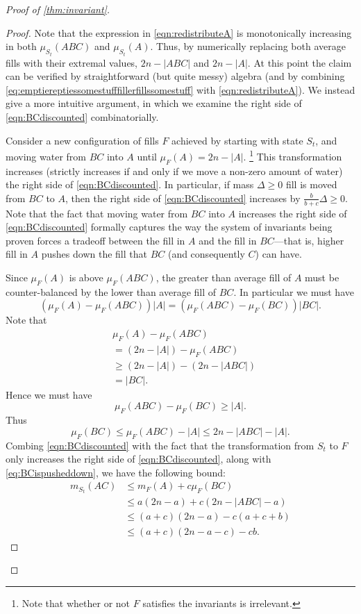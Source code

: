 \begin{proof}[Proof of \cref{thm:invariant}]
\begin{proof}
Note that the expression in \eqref{eqn:redistributeA} is monotonically
increasing in both $\mu_{S_t}(ABC)$ and $\mu_{S_t}(A)$. Thus, by numerically
replacing both average fills with their extremal values, $2n-|ABC|$ and
$2n-|A|$. At this point the claim can be verified by straightforward (but quite
messy) algebra (and by combining
\eqref{eq:emptiereptiessomestufffillerfillssomestuff} with
\eqref{eqn:redistributeA}). We instead give a more intuitive argument, in which
we examine the right side of \eqref{eqn:BCdiscounted} combinatorially.

 Consider a new configuration of fills $F$ achieved by starting with state
 $S_t$, and moving water from $BC$ into $A$ until $\mu_{F}(A) = 2n-|A|$.
 \footnote{Note that whether or not $F$ satisfies the invariants is
 irrelevant.} This transformation increases (strictly increases if and only if
 we move a non-zero amount of water) the right side of
 \eqref{eqn:BCdiscounted}. In particular, if mass $\Delta \ge 0$ fill is moved
 from $BC$ to $A$, then the right side of \eqref{eqn:BCdiscounted} increases by
 $\frac{b}{b+c} \Delta \ge 0$. Note that the fact that moving water from $BC$
 into $A$ increases the right side of \eqref{eqn:BCdiscounted} formally
 captures the way the system of invariants being proven forces a tradeoff
 between the fill in $A$ and the fill in $BC$---that is, higher fill in $A$
 pushes down the fill that $BC$ (and consequently $C$) can have.

  Since $\mu_F(A)$ is above $\mu_{F}(ABC)$, the greater than average fill of
  $A$ must be counter-balanced by the lower than average fill of $BC$. In
  particular we must have
  $$(\mu_F(A) - \mu_F(ABC))|A| = (\mu_F(ABC) -\mu_F(BC))|BC|.$$
  Note that 
  \begin{align*}
  & \mu_F(A) -\mu_F(ABC) \\
  &= (2n-|A|) - \mu_F(ABC) \\
  &\ge (2n-|A|) - (2n-|ABC|) \\
  &= |BC|.    
  \end{align*}
  Hence we must have 
  $$\mu_F(ABC) - \mu_F(BC) \ge |A|.$$
  Thus 
  \begin{equation}
      \mu_F(BC) \le \mu_F(ABC) - |A| \le 2n-|ABC| -|A|.
      \label{eq:BCispusheddown}
  \end{equation}
  Combing \eqref{eqn:BCdiscounted} with the fact that the transformation from
  $S_t$ to $F$ only increases the right side of \eqref{eqn:BCdiscounted}, along
  with \eqref{eq:BCispusheddown}, we have the following bound:
  \begin{align}
    m_{S_t}(AC)
  &\le m_{F}(A) + c\mu_{F}(BC) \nonumber \\
  &\le a(2n-a) + c(2n-|ABC|-a) \nonumber \\
  &\le (a+c)(2n-a) - c(a+c+b) \nonumber \\
  &\le (a+c)(2n-a-c) - cb. \label{eq:eqnwithcb}
  \end{align}
  

\end{proof}
\end{proof}
